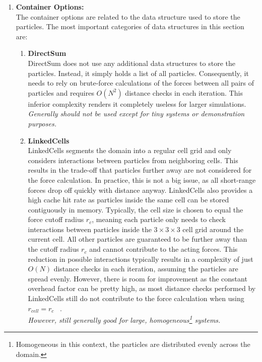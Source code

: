 \begin{enumerate}[label=\textbf{\arabic*.}]
      \item \textbf{Container Options:} \\
            The container options are related to the data structure used to store the particles. The most important categories of data structures in this section are:
            \begin{enumerate}
                  \item \textbf{DirectSum} \\
                        DirectSum does not use any additional data structures to store the particles. Instead, it simply holds a list of all particles. Consequently, it needs to rely on brute-force calculations of the forces between all pairs of particles and requires $O(N^2)$ distance checks in each iteration. This inferior complexity renders it completely useless for larger simulations.\\
                        \textit{Generally should not be used except for tiny systems or demonstration purposes.~\cite{VICCIONE2008625}}
                  \item \textbf{LinkedCells} \\
                        LinkedCells segments the domain into a regular cell grid and only considers interactions between particles from neighboring cells. This results in the trade-off that particles further away are not considered for the force calculation. In practice, this is not a big issue, as all short-range forces drop off quickly with distance anyway.
                        LinkedCells also provides a high cache hit rate as particles inside the same cell can be stored contiguously in memory. Typically, the cell size is chosen to equal the force cutoff radius $r_c$, meaning each particle only needs to check interactions between particles inside the $3\times3\times3$ cell grid around the current cell. All other particles are guaranteed to be further away than the cutoff radius $r_c$ and cannot contribute to the acting forces.
                        This reduction in possible interactions typically results in a complexity of just $O(N)$ distance checks in each iteration, assuming the particles are spread evenly. However, there is room for improvement as the constant overhead factor can be pretty high, as most distance checks performed by LinkedCells still do not contribute to the force calculation when using $r_{cell}=r_c$ ~\cite{GRATL2019748}.\\
                        \textit{However, still generally good for large, homogeneous\footnote{Homogeneous in this context, the particles are distributed evenly across the domain.} systems.}


\end{enumerate}
\end{enumerate}
